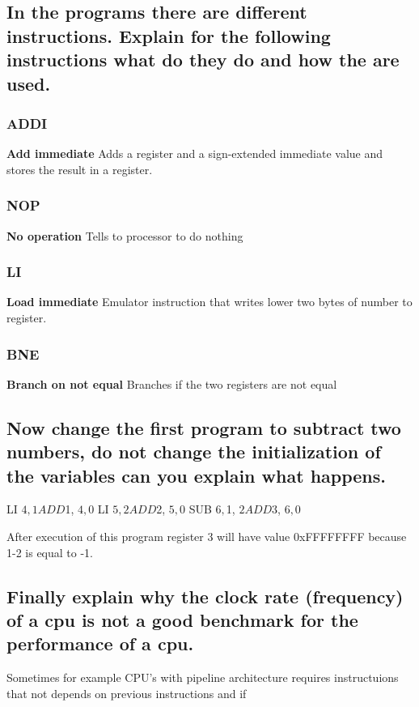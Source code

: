 \documentclass[a4paper,11pt]{article}
\begin{document}
\subsection{In the programs there are different instructions. Explain for the following instructions what  do they do and how the are used.}
\subsubsection{ADDI}
\textbf{Add immediate} Adds a register and a sign-extended immediate value and stores the result in a register. 
\subsubsection{NOP}
\textbf{No operation} Tells to processor to do nothing
\subsubsection{LI}
\textbf{Load immediate} Emulator instruction that writes lower two bytes of number to register.
\subsubsection{BNE}
\textbf{Branch on not equal} Branches if the two registers are not equal
\subsection{Now change the first program to subtract two numbers, do not change the initialization of the  variables can you explain what happens.}

\begin{bashcode}
LI  $4, 1
ADD   $1, $4, $0
LI  $5, 2
ADD   $2, $5, $0
SUB   $6, $1, $2
ADD   $3, $6, $0
\end{bashcode}

After execution of this program register 3 will have value 0xFFFFFFFF because 1-2 is equal to -1.

\subsection{Finally explain why the clock rate (frequency) of a cpu is not a good benchmark for the  performance of a cpu.}
Sometimes for example CPU's with pipeline architecture requires instructuions that not depends on previous instructions and if 
\end{document}

